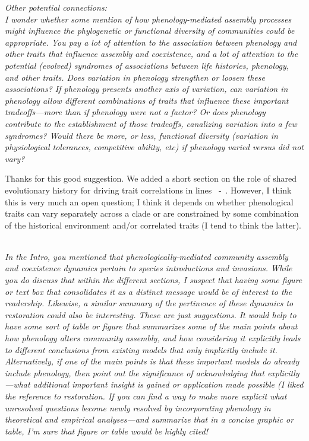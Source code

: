 \documentclass[11pt]{article}
\newcommand{\lr}[1]{~\lineref{#1}}
\begin{document}
\emph{Other potential connections:\\
I wonder whether some mention of how phenology-mediated assembly processes might influence the phylogenetic or functional diversity of communities could be appropriate. You pay a lot of attention to the association between phenology and other traits that influence assembly and coexistence, and a lot of attention to the potential (evolved) syndromes of associations between life histories, phenology, and other traits. Does variation in phenology strengthen or loosen these associations? If phenology presents another axis of variation, can variation in phenology allow different combinations of traits that influence these important tradeoffs—more than if phenology were not a factor? Or does phenology contribute to the establishment of those tradeoffs, canalizing variation into a few syndromes? Would there be more, or less, functional diversity (variation in physiological tolerances, competitive ability, etc) if phenology varied versus did not vary?}

Thanks for this good suggestion. We added a short section on the role of shared evolutionary history for driving trait correlations in lines \lr{phylo1}-\lr{phylo2}. However, I think this is very much an open question; I think it depends on whether phenological traits can vary separately across a clade or are constrained by some combination of the historical environment and/or correlated traits (I tend to think the latter).

\textcolor{red}{}\\

\emph{In the Intro, you mentioned that phenologically-mediated community assembly and coexistence dynamics pertain to species introductions and invasions. While you do discuss that within the different sections, I suspect that having some figure or text box that consolidates it as a distinct message would be of interest to the readership. Likewise, a similar summary of the pertinence of these dynamics to restoration could also be interesting. These are just suggestions. It would help to have some sort of table or figure that summarizes some of the main points about how phenology alters community assembly, and how considering it explicitly leads to different conclusions from existing models that only implicitly include it. Alternatively, if one of the main points is that these important models do already include phenology, then point out the significance of acknowledging that explicitly—what additional important insight is gained or application made possible (I liked the reference to restoration. If you can find a way to make more explicit what unresolved questions become newly resolved by incorporating phenology in theoretical and empirical analyses—and summarize that in a concise graphic or table, I’m sure that figure or table would be highly cited!}
\end{document}
